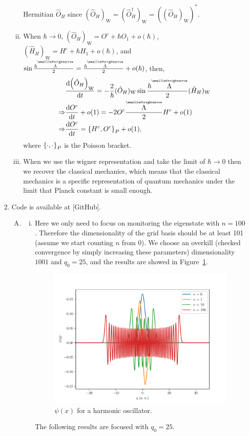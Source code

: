 \documentclass{article}
\newcommand{\tensor}[1]{\overset{\scriptscriptstyle\smallleftrightarrow}{#1}}
\begin{document}
\begin{enumerate}[1.]
\begin{enumerate}[(i)]
    Hermitian $\hat{O}_H$ since $(\hat{O}_H)_\mathrm{W} = (\hat{O}_H^\dagger)_\mathrm{W} = ((\hat{O}_H)_\mathrm{W})^*$.
    \item When $\hbar \to 0$, $(\hat{O}_H)_\mathrm{W} = O^c + \hbar O_1 + o(\hbar)$, $(\hat{H}_H)_\mathrm{W} = H^c + \hbar H_1 + o(\hbar)$, and $\sin {\frac{\hbar\tensor{\Lambda}}{2}} = \frac{\hbar\tensor{\Lambda}}{2} + o(\hbar)$, then,
    \begin{align*}
     & \dv{\qty(\hat{O}_H)_\mathrm{W}}{t} = -\frac{2}{\hbar}(\hat{O}_H)_\mathrm{W} \sin{\frac{\hbar\tensor{\Lambda}}{2}} (\hat{H}_H)_\mathrm{W}\\
     \Rightarrow & \dv{O^c}{t} + o(1) = -2O^c\frac{\tensor{\Lambda}}{2} H^c + o(1) \\
     \Rightarrow & \dv{O^c}{t} = \acomm{H^c}{O^c}_P + o(1),
    \end{align*} 
    where $\acomm{\cdot}{\cdot}_P$ is the Poisson bracket.
    \item When we use the wigner representation and take the limit of $\hbar \to 0$ then we recover the classical mechanics, which means that the classical mechanics is a specific representation of quantum mechanics under the limit that Planck constant is small enough.
  \end{enumerate}

  \item Code is available at [GitHub].
  \begin{enumerate}[(A)]
    \item
    \begin{enumerate}[(i)]
      \item Here we only need to focus on monitoring the eigenstate with $n = 100$. Therefore the dimensionality of the grid basis should be at least 101 (assume we start counting $n$ from $0$).  We choose an overkill (checked convergence by simply increasing these parameters) dimensionality $1001$ and $q_0 = 25$, and the results are showed in Figure~\ref{fig:q6a-1}.
      \begin{figure}[H]
        \centering
        \includegraphics[width=0.6\linewidth]{q6a-1.pdf}
        \caption{$\psi(x)$ for a harmonic oscillator.}
        \label{fig:q6a-1}
      \end{figure}
      The following results are focused with $q_0 = 25$.


\end{enumerate}
\end{enumerate}
\end{enumerate}
\end{document}
